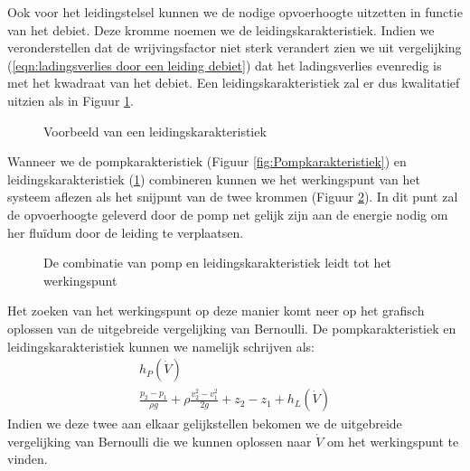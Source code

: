 Ook voor het leidingstelsel kunnen we de nodige opvoerhoogte uitzetten in functie van het debiet. Deze kromme noemen we de leidingskarakteristiek. Indien we veronderstellen dat de wrijvingsfactor niet sterk verandert zien we uit vergelijking (\ref{eqn:ladingsverlies door een leiding debiet}) dat het ladingsverlies evenredig is met het kwadraat van het debiet. Een leidingskarakteristiek zal er dus kwalitatief uitzien als in Figuur \ref{fig:Leidingskarakteristiek}.
\begin{figure}
	\centering
	
	\caption{Voorbeeld van een leidingskarakteristiek}
	\label{fig:Leidingskarakteristiek}
\end{figure}
Wanneer we de pompkarakteristiek (Figuur \ref{fig:Pompkarakteristiek}) en leidingskarakteristiek (\ref{fig:Leidingskarakteristiek}) combineren kunnen we het werkingspunt van het systeem aflezen als het snijpunt van de twee krommen (Figuur \ref{fig:Pompleidingkarakteristiek}). In dit punt zal de opvoerhoogte geleverd door de pomp net gelijk zijn aan de energie nodig om her fluïdum door de leiding te verplaatsen.
\begin{figure}
	\centering
	
	\caption{De combinatie van pomp en leidingskarakteristiek leidt tot het werkingspunt}
	\label{fig:Pompleidingkarakteristiek}
\end{figure}
Het zoeken van het werkingspunt op deze manier komt neer op het grafisch oplossen van de uitgebreide vergelijking van Bernoulli. De pompkarakteristiek en leidingskarakteristiek kunnen we namelijk schrijven als:
\begin{eqnarray}
	h_P(\dot{V}) \\
	\frac{p_2-p_1}{\rho g} + \rho \frac{v_2^2-v_1^2}{2 g}  + z_2-z_1 + h_L(\dot{V})
\end{eqnarray}
Indien we deze twee aan elkaar gelijkstellen bekomen we de uitgebreide vergelijking van Bernoulli die we kunnen oplossen naar $\dot{V}$ om het werkingspunt te vinden.

